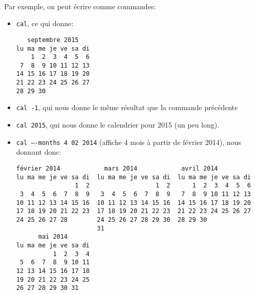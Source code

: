 \paragraph{} Par exemple, on peut écrire comme commandes:
\begin{itemize}
	\item \texttt{cal}, ce qui donne:
\begin{lstlisting}
   septembre 2015
lu ma me je ve sa di
    1  2  3  4  5  6
 7  8  9 10 11 12 13
14 15 16 17 18 19 20
21 22 23 24 25 26 27
28 29 30
\end{lstlisting}
	\item \texttt{cal -1}, qui nous donne le même résultat que la commande
		précédente
	\item \texttt{cal 2015}, qui nous donne le calendrier pour 2015
		(un peu long).
	\item \texttt{cal ----months 4 02 2014} (affiche 4 mois à partir de février
		2014), nous donnant donc:
\begin{lstlisting}[basicstyle=\footnotesize\ttfamily]
    février 2014            mars 2014            avril 2014
lu ma me je ve sa di  lu ma me je ve sa di  lu ma me je ve sa di
                1  2                  1  2      1  2  3  4  5  6
 3  4  5  6  7  8  9   3  4  5  6  7  8  9   7  8  9 10 11 12 13
10 11 12 13 14 15 16  10 11 12 13 14 15 16  14 15 16 17 18 19 20
17 18 19 20 21 22 23  17 18 19 20 21 22 23  21 22 23 24 25 26 27
24 25 26 27 28        24 25 26 27 28 29 30  28 29 30
                      31
      mai 2014
lu ma me je ve sa di
          1  2  3  4
 5  6  7  8  9 10 11
12 13 14 15 16 17 18
19 20 21 22 23 24 25
26 27 28 29 30 31
\end{lstlisting}
\end{itemize}
